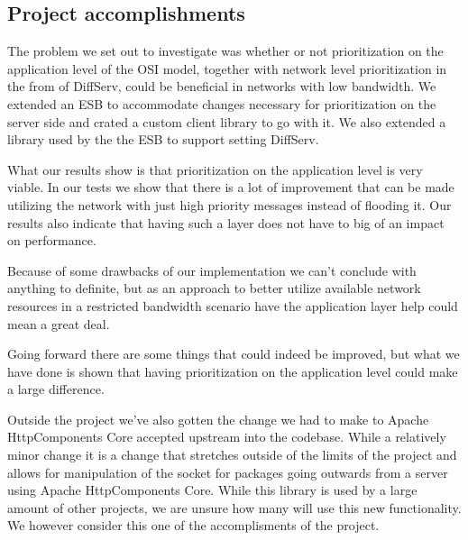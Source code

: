 \subsection{Project accomplishments}\label{Project accomplishments}
	The problem we set out to investigate was whether or not prioritization on the application level of the OSI model, together with network level prioritization in the from of DiffServ, could be beneficial in networks with low bandwidth. We extended an ESB to accommodate changes necessary for prioritization on the server side and crated a custom client library to go with it. We also extended a library used by the the ESB to support setting DiffServ.
	
	What our results show is that prioritization on the application level is very viable. In our tests we show that there is a lot of improvement that can be made utilizing the network with just high priority messages instead of flooding it. Our results also indicate that having such a layer does not have to big of an impact on performance.
	
	Because of some drawbacks of our implementation we can't conclude with anything to definite, but as an approach to better utilize available network resources in a restricted bandwidth scenario have the application layer help could mean a great deal.
	
	Going forward there are some things that could indeed be improved, but what we have done is shown that having prioritization on the application level could make a large difference.

	Outside the project we've also gotten the change we had to make to Apache HttpComponents Core accepted upstream into the codebase. While a relatively minor change it is a change that stretches outside of the limits of the project and allows for manipulation of the socket for packages going outwards from a server using Apache HttpComponents Core. While this library is used by a large amount of other projects, we are unsure how many will use this new functionality. We however consider this one of the accomplisments of the project.
